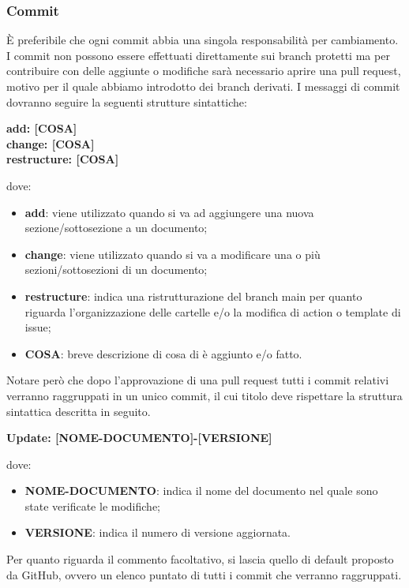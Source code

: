 \subsubsection{Commit}\label{inf:comm}
È preferibile che ogni commit abbia una singola responsabilità per cambiamento.
I commit non possono essere effettuati direttamente sui branch protetti ma per contribuire con delle aggiunte o
modifiche sarà necessario aprire una pull request, motivo per il quale abbiamo introdotto dei branch derivati.
I messaggi di commit dovranno seguire la seguenti strutture sintattiche:
\begin{center}
      \textbf{add: [COSA]\\
      change: [COSA]\\
      restructure: [COSA]}
\end{center}
dove:
\begin{itemize}
      \item \textbf{add}: viene utilizzato quando si va ad aggiungere una nuova sezione/sottosezione a un documento;
      \item \textbf{change}: viene utilizzato quando si va a modificare una o più sezioni/sottosezioni di un documento;
      \item \textbf{restructure}: indica una ristrutturazione del branch main per quanto riguarda l'organizzazione delle cartelle e/o la modifica di action o template di issue;
      \item \textbf{COSA}: breve descrizione di cosa di è aggiunto e/o fatto.
\end{itemize}

Notare però che dopo l'approvazione di una pull request tutti i commit relativi
verranno raggruppati in un unico commit, il cui titolo deve rispettare la
struttura sintattica descritta in seguito.
\begin{center}
      \textbf{Update: [NOME-DOCUMENTO]-[VERSIONE]}
\end{center}
dove:

\begin{itemize}
      \item \textbf{NOME-DOCUMENTO}: indica il nome del documento nel quale sono state verificate le modifiche;
      \item \textbf{VERSIONE}: indica il numero di versione aggiornata.
\end{itemize}
Per quanto riguarda il commento facoltativo, si lascia quello di default proposto da GitHub,
ovvero un elenco puntato di tutti i commit che verranno raggruppati.\\


